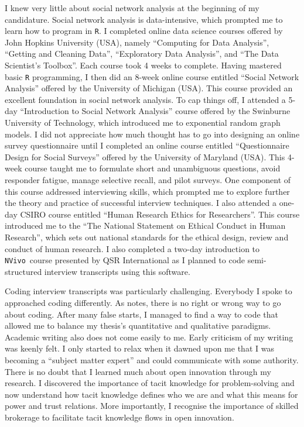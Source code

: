 \documentclass[12pt,table,xcdraw]{book}
\begin{document}
I knew very little about social network analysis at the beginning of my candidature. Social network analysis is data-intensive, which prompted me to learn how to program in \texttt{R}. I completed online data science courses offered by John Hopkins University (USA), namely \enquote{Computing for Data Analysis}, \enquote{Getting and Cleaning Data}, \enquote{Exploratory Data Analysis}, and \enquote{The Data Scientist's Toolbox}. Each course took 4 weeks to complete. Having mastered basic \texttt{R} programming, I then did an 8-week online course entitled \enquote{Social Network Analysis} offered by the University of Michigan (USA). This course provided an excellent foundation in social network analysis. To cap things off, I attended a 5-day \enquote{Introduction to Social Network Analysis} course offered by the Swinburne University of Technology, which introduced me to exponential random graph models. I did not appreciate how much thought has to go into designing an online survey questionnaire until I completed an online course entitled \enquote{Questionnaire Design for Social Surveys} offered by the University of Maryland (USA). This 4-week course taught me to formulate short and unambiguous questions, avoid responder fatigue, manage selective recall, and pilot surveys. One component of this course addressed interviewing skills, which prompted me to explore further the theory and practice of successful interview techniques. I also attended a one-day CSIRO course entitled \enquote{Human Research Ethics for Researchers}. This course introduced me to the \enquote{The National Statement on Ethical Conduct in Human Research}, which sets out national standards for the ethical design, review and conduct of human research. I also completed a two-day introduction to \texttt{NVivo}\texttrademark\ course presented by QSR International as I planned to code semi-structured interview transcripts using this software. \medskip

Coding interview transcripts was particularly challenging. Everybody I spoke to approached coding differently. As \citet{saldana2015coding} notes, there is no right or wrong way to go about coding. After many false starts, I managed to find a way to code that allowed me to balance my thesis's quantitative and qualitative paradigms. Academic writing also does not come easily to me. Early criticism of my writing was keenly felt. I only started to relax when it dawned upon me that I was becoming a \enquote{subject matter expert} and could communicate with some authority. There is no doubt that I learned much about open innovation through my research. I discovered the importance of tacit knowledge for problem-solving and now understand how tacit knowledge defines who we are and what this means for power and trust relations. More importantly, I recognise the importance of skilled brokerage to facilitate tacit knowledge flows in open innovation. 
\end{document}
